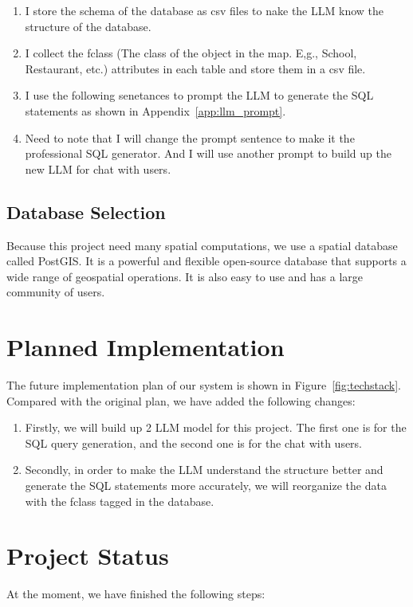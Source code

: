 \documentclass{article}
\begin{document}
\begin{enumerate}
    \item I store the schema of the database as csv files to nake the LLM know the structure of the database.
    \item I collect the fclass (The class of the object in the map. E,g., School, Restaurant, etc.) attributes in each table and store them in a csv file.
    \item I use the following senetances to prompt the  LLM to generate the SQL statements as shown in Appendix~\ref{app:llm_prompt}.
    \item Need to note that I will change the prompt sentence to make it the professional SQL generator. And I will use another prompt to build up the new LLM for chat with users.
\end{enumerate}


\subsection{Database Selection}
Because this project need many spatial computations, we use a spatial database called PostGIS. It is a powerful and flexible open-source database that supports a wide range of geospatial operations. It is also easy to use and has a large community of users.

\section{Planned Implementation}
The future implementation plan of our system is shown in Figure~\ref{fig:techstack}. Compared with the original plan, we have added the following changes:

\begin{enumerate}
    \item Firstly, we will build up 2 LLM model for this project. The first one is for the SQL query generation, and the second one is for the chat with users.
    \item Secondly,  in order to make the LLM understand the structure better and generate the SQL statements more accurately, we will reorganize the data with the fclass tagged in the database.
\end{enumerate}

\section{Project Status}
At the moment, we have finished the following steps:
\end{document}
